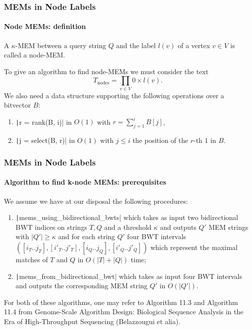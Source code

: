 \begin{frame}
	\frametitle{MEMs in Node Labels}
	\framesubtitle{Node MEMs: definition}
	\begin{definition}
		A \(\kappa\)-MEM between a query string \(Q\) and the label \(l(v)\) of a vertex \(v \in V\)
		is called a node-MEM.
	\end{definition}

	To give an algorithm to find node-MEMs we must consider the text
	\[
		T_{\text{nodes}} = \prod_{v \in V} 0 \times l(v).
	\]
	\onslide<3>We also need a data structure supporting the following operations over a bitvector \(B\):
	\begin{enumerate}
		\item \texttt|r = rank(B, i)| in \(O(1)\) with \(r = \sum_{j=1}^{i} B[j]\),
		\item \texttt|j = select(B, r)| in \(O(1)\) with \(j \leq i\) the position of
		the \(r\)-th 1 in \(B\).
	\end{enumerate}
\end{frame}

\begin{frame}
	\frametitle{MEMs in Node Labels}
	\framesubtitle{Algorithm to find k-node MEMs: prerequisites}
	We assume we have at our disposal the following procedures:
	\begin{enumerate}
		\item \texttt|mems_using_bidirectional_bwts| which takes as input two
		bidirectional BWT indices on strings \(T, Q\) and a threshold \(\kappa\) and outputs
		\(Q'\) MEM strings with \(|Q'| \geq \kappa\) and for each string \(Q'\) four BWT intervals
		\(([i_T..j_T], [i'_T..j'_T], [i_Q..j_Q], [i'_Q..j'_Q])\) which represent the maximal
		matches of \(T\) and \(Q\) in \(O(|T| + |Q|)\) time;
		\onslide<2-3>\item \texttt|mems_from_bidirectional_bwt| which takes as input four BWT
		intervals and outputs the corresponding MEM string \(Q'\) in \(O(|Q'|)\).
	\end{enumerate}
	 For both of these algorithms, one may refer to Algorithm 11.3 and Algorithm 11.4 from
	Genome-Scale Algorithm Design: Biological Sequence Analysis in the Era of High-Throughput Sequencing
	(Belazzougui et alia).
\end{frame}

